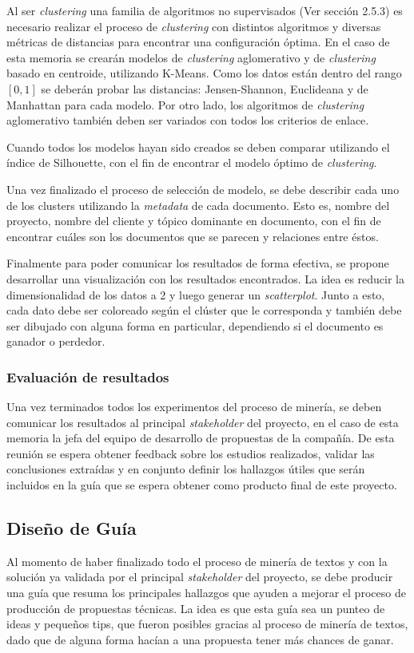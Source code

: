      Al ser \textit{clustering} una familia de algoritmos no supervisados (Ver sección 2.5.3) es necesario realizar el proceso de \textit{clustering} con distintos algoritmos y diversas métricas de distancias para encontrar una configuración óptima. En el caso de esta memoria se crearán modelos de \textit{clustering} aglomerativo y de \textit{clustering} basado en centroide, utilizando K-Means. Como los datos están dentro del rango $[0,1]$ se deberán probar las distancias: Jensen-Shannon, Euclideana y de Manhattan para cada modelo. Por otro lado, los algoritmos de \textit{clustering} aglomerativo también deben ser variados con todos los criterios de enlace.
     
     Cuando todos los modelos hayan sido creados se deben comparar utilizando el índice de Silhouette, con el fin de encontrar el modelo óptimo de \textit{clustering}.
     
     Una vez finalizado el proceso de selección de modelo, se debe describir cada uno de los clusters utilizando la \textit{metadata} de cada documento. Esto es, nombre del proyecto, nombre del cliente y tópico dominante en documento, con el fin de encontrar cuáles son los documentos que se parecen y relaciones entre éstos.
     
     Finalmente para poder comunicar los resultados de forma efectiva, se propone desarrollar una  visualización con los resultados encontrados. La idea es reducir la dimensionalidad de los datos a 2 y luego generar un \textit{scatterplot}. Junto a esto, cada dato debe ser coloreado según el clúster que le corresponda y también debe ser dibujado con alguna forma en particular, dependiendo si el documento es ganador o perdedor.
   
\subsubsection{Evaluación de resultados}
    Una vez terminados todos los experimentos del proceso de minería, se deben comunicar los resultados al principal \textit{stakeholder} del proyecto, en el caso de esta memoria la jefa del equipo de desarrollo de propuestas de la compañía. De esta reunión se espera obtener feedback sobre los estudios realizados, validar las conclusiones extraídas y en conjunto definir los hallazgos útiles que serán incluidos en la guía que se espera obtener como producto final de este proyecto.
     
\subsection{Diseño de Guía}
     Al momento de haber finalizado todo el proceso de minería de textos y con la solución ya validada por el principal \textit{stakeholder} del proyecto, se debe producir una guía que resuma los principales hallazgos que ayuden a mejorar el proceso de producción de propuestas técnicas. La idea es que esta guía sea un punteo de ideas y pequeños tips, que fueron posibles gracias al proceso de minería de textos, dado que de alguna forma hacían a una propuesta tener más chances de ganar.

    